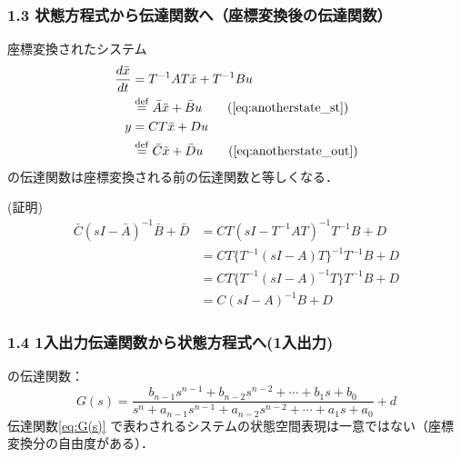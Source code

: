 \begin{frame}[t]
\frametitle{1.3 状態方程式から伝達関数へ{\small （座標変換後の伝達関数）}}
座標変換されたシステム
\begin{align}
 \frac{d \bar{x}}{dt}
 &= T^{-1} A T \bar{x} + T^{-1} B u \nonumber \\
 & \defeq \bar{A} \bar{x} + \bar{B} u \tag{\ref{eq:anotherstate_st}}\\
 y &= C T \bar{x} + D u \nonumber \\
   & \defeq \bar{C} \bar{x} + \bar{D} u
\tag{\ref{eq:anotherstate_out}}
\end{align}
の伝達関数は座標変換される前の伝達関数と等しくなる．

(証明)
\begin{align}
 \bar{C} (sI - \bar{A})^{-1} \bar{B} + \bar{D}
 &= CT (sI - T^{-1} A T )^{-1} T^{-1} B + D
\nonumber\\
 &= C T \{ T^{-1} (sI - A) T \}^{-1} T^{-1} B + D
\nonumber\\
 &= C T \{ T^{-1} (sI - A)^{-1} T \} T^{-1} B + D
\nonumber \\
 &= C (sI - A)^{-1} B + D
\end{align}
\end{frame}

\begin{frame}[t]
\frametitle{1.4 1入出力伝達関数から状態方程式へ(1入出力)}
の伝達関数：
\begin{equation}
 G(s) =
  \frac{b_{n-1} s^{n-1} + b_{n-2} s^{n-2} + \cdots + b_1 s + b_0}
  {s^n + a_{n-1} s^{n-1} + a_{n-2} s^{n-2} + \cdots + a_1 s + a_0}
  + d
  \label{eq:G(s)}
\end{equation}
伝達関数\eqref{eq:G(s)} で表わされるシステムの状態空間表現は一意ではない（座標変換分の自由度がある）．
\end{frame}


